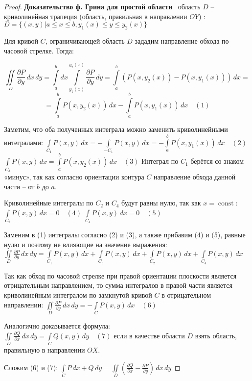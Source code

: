 \begin{proof}
\textbf{Доказательство ф. Грина для простой области}
\mathLet \ область $D$ -- криволинейная трапеция (область, правильная в направлении $OY$)
: $D = \{ (x,y)|a \le x \le b, y_1(x) \le y \le y_2(x) \}$

Для кривой $C$, ограничивающей область $D$ зададим направление обхода по часовой стрелке. Тогда:

\[\iint\limits_{D} \frac{\partial P}{\partial y} \,dx\,dy
	= \int\limits_{a}^{b}dx \int\limits_{y_1(x)}^{y_2(x)} \frac{\partial P}{\partial y} \,dy 
	= \int\limits_{a}^{b} (P(x,y_2(x)) - P(x,y_1(x))) \,dx =\]
\[= \int\limits_{a}^{b} P(x,y_2(x)) \,dx - \int\limits_{a}^{b} P(x,y_1(x)) \,dx \quad (1)\]

Заметим, что оба полученных интеграла можно заменить криволинейными интегралами:
$\int\limits_{C_1} P(x,y) \,dx = -\int\limits_{-C_1} P(x,y) \,dx = -\int\limits_{a}^{b} P(x,y_1(x)) \,dx \quad (2)$
$\int\limits_{C_3} P(x,y) \,dx = \int\limits_{a}^{b} P(x,y_2(x)) \,dx \quad (3)$
Интеграл по $C_1$ берётся со знаком «минус», так как согласно ориентации контура $C$ направление обхода данной части -- от $b$ до $a$.

Криволинейные интегралы по $C_2$ и $C_4$ будут равны нулю, так как $x = \operatorname{const}$:
$\int\limits_{C_2} P(x,y) \,dx = 0 \quad (4)$
$\int\limits_{C_4} P(x,y) \,dx = 0 \quad (5)$

Заменим в (1) интегралы согласно (2) и (3), а также прибавим (4) и (5), равные нулю и поэтому не влияющие на значение выражения:\\
$\iint\limits_{D} \frac{\partial P}{\partial y} \,dx\,dy = \int\limits_{C_1} P(x,y) \,dx + \int\limits_{C_3} P(x,y) \,dx + \int\limits_{C_2} P(x,y) \,dx + \int\limits_{C_4} P(x,y) \,dx$

Так как обход по часовой стрелке при правой ориентации плоскости является отрицательным направлением, то сумма интегралов в правой части является криволинейным интегралом по замкнутой кривой $C$ в отрицательном направлении:
$\iint\limits_{D} \frac{\partial P}{\partial y} \,dx\,dy = -\int\limits_{C} P(x,y) \,dx \quad (6)$

Аналогично доказывается формула:\\
$\iint\limits_{D} \frac{\partial Q}{\partial x} \,dx\,dy = \int\limits_{C} Q(x,y) \,dy \quad (7)$
если в качестве области $D$ взять область, правильную в направлении $OX$.

Сложим (6) и (7):
$\int\limits_{C} P \,dx + Q \,dy = \iint\limits_{D} \left( \frac{\partial Q}{\partial x} - \frac{\partial P}{\partial y} \right) \,dx\,dy$
\end{proof}

